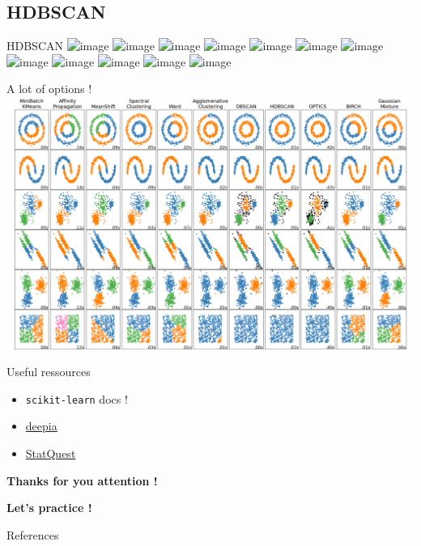 \documentclass{irdbeamer}
\begin{document}
\subsection{HDBSCAN}
\begin{frame}{HDBSCAN}
    \centering
    \includegraphics<1>[width=.7\textwidth]{./figs/hdbscan/1.png}%
    \includegraphics<2>[width=.7\textwidth]{./figs/hdbscan/2.png}%
    \includegraphics<3>[width=.7\textwidth]{./figs/hdbscan/3.png}%
    \includegraphics<4>[width=.7\textwidth]{./figs/hdbscan/4.png}%
    \includegraphics<5>[width=.7\textwidth]{./figs/hdbscan/5.png}%
    \includegraphics<6>[width=.7\textwidth]{./figs/hdbscan/6.png}%
    \includegraphics<7>[width=.7\textwidth]{./figs/hdbscan/7.png}%
    \includegraphics<8>[width=.7\textwidth]{./figs/hdbscan/8.png}%
    \includegraphics<9>[width=.7\textwidth]{./figs/hdbscan/9.png}%
    \includegraphics<10>[width=.7\textwidth]{./figs/hdbscan/10.png}%
    \includegraphics<11>[width=.7\textwidth]{./figs/hdbscan/11.png}%
    \includegraphics<12>[width=.7\textwidth]{./figs/hdbscan/12.png}%
\end{frame}

\begin{frame}{A lot of options !}
    \centering
    \vspace{-.2cm}
    \includegraphics[width=.8\textwidth]{./figs/all_clusterings.png}
\end{frame}

\begin{frame}{Useful ressources}

\begin{itemize}
    \item \texttt{scikit-learn} docs !
    \item \href{https://www.youtube.com/@Deepia-ls2fo}{deepia}
    \item \href{https://www.youtube.com/@statquest}{StatQuest}
\end{itemize}
\end{frame}

\begin{frame}[plain]
    \Huge{\textbf{Thanks for you attention !}}
    
    \vfill
    
    \LARGE{\textbf{Let's practice !}}
\end{frame}

\appendix
\begin{frame}[allowframebreaks]{References}
    {\footnotesize \printbibliography[heading=none]}
\end{frame}
\end{document}
